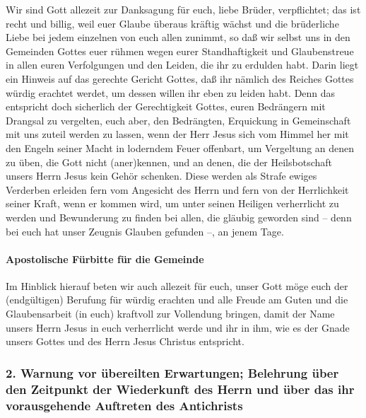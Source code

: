  Wir sind Gott allezeit zur Danksagung für euch, liebe
Brüder, verpflichtet; das ist recht und billig, weil euer Glaube überaus
kräftig wächst und die brüderliche Liebe bei jedem einzelnen von euch
allen zunimmt,  so daß wir selbst uns in den Gemeinden
Gottes euer rühmen wegen eurer Standhaftigkeit und Glaubenstreue in
allen euren Verfolgungen und den Leiden, die ihr zu erdulden habt.
 Darin liegt ein Hinweis auf das gerechte Gericht Gottes,
daß ihr nämlich des Reiches Gottes würdig erachtet werdet, um dessen
willen ihr eben zu leiden habt.  Denn das entspricht doch
sicherlich der Gerechtigkeit Gottes, euren Bedrängern mit Drangsal zu
vergelten,  euch aber, den Bedrängten, Erquickung in
Gemeinschaft mit uns zuteil werden zu lassen, wenn der Herr Jesus sich
vom Himmel her mit den Engeln seiner Macht  in loderndem
Feuer offenbart, um Vergeltung an denen zu üben, die Gott nicht
(aner)kennen, und an denen, die der Heilsbotschaft unsers Herrn Jesus
kein Gehör schenken.  Diese werden als Strafe ewiges
Verderben erleiden fern vom Angesicht des Herrn und fern von der
Herrlichkeit seiner Kraft,  wenn er kommen wird, um unter
seinen Heiligen verherrlicht zu werden und Bewunderung zu finden bei
allen, die gläubig geworden sind -- denn bei euch hat unser Zeugnis
Glauben gefunden --, an jenem Tage.

\hypertarget{apostolische-fuxfcrbitte-fuxfcr-die-gemeinde}{%
\paragraph{Apostolische Fürbitte für die
Gemeinde}\label{apostolische-fuxfcrbitte-fuxfcr-die-gemeinde}}

 Im Hinblick hierauf beten wir auch allezeit für euch,
unser Gott möge euch der (endgültigen) Berufung für würdig erachten und
alle Freude am Guten und die Glaubensarbeit (in euch) kraftvoll zur
Vollendung bringen,  damit der Name unsers Herrn Jesus in
euch verherrlicht werde und ihr in ihm, wie es der Gnade unsers Gottes
und des Herrn Jesus Christus entspricht.

\hypertarget{warnung-vor-uxfcbereilten-erwartungen-belehrung-uxfcber-den-zeitpunkt-der-wiederkunft-des-herrn-und-uxfcber-das-ihr-vorausgehende-auftreten-des-antichrists}{%
\subsubsection{2. Warnung vor übereilten Erwartungen; Belehrung über den
Zeitpunkt der Wiederkunft des Herrn und über das ihr vorausgehende
Auftreten des
Antichrists}\label{warnung-vor-uxfcbereilten-erwartungen-belehrung-uxfcber-den-zeitpunkt-der-wiederkunft-des-herrn-und-uxfcber-das-ihr-vorausgehende-auftreten-des-antichrists}}

